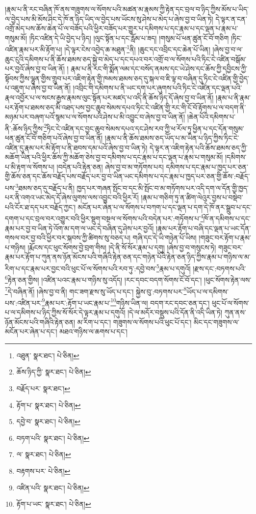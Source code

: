 །རྣམ་པ་ནི་རང་བཞིན་ཁོ་ནས་གཟུགས་ལ་སོགས་པའི་མཚན་མ་རྣམས་ཀྱི་རྟེན་དང་བྲལ་བ་ཉིད་ཀྱིས་མོས་པ་ཡིད་ལ་བྱེད་པས་མི་མོས་ཤིང་དེ་ཁོ་ན་ཉིད་ཡིད་ལ་བྱེད་པས་ཡོངས་སུ་ཤེས་པ་མེད་པ་ཞེས་བྱ་བ་ཡིན་ཏེ། དེ་ལྟར་ན་ངན་འགྲོ་མེད་པས་ཆོས་ཆེན་པོ་ལ་བཟོད་པའི་ཕྱིར་བཟོད་པར་གྱུར་པ་དམིགས་པ་དང་རྣམ་པ་དང་ལྡན་པ་རྣམ་པ་གསུམ་མོ། །ཏིང་འཛིན་དེ་ཡི་བྱེད་པ་ཉིད། །ལུང་སྟོན་པ་དང་རློམ་པ་ཟད། །གསུམ་པོ་ཕན་ཚུན་ངོ་བོ་གཅིག །ཏིང་འཛིན་རྣམ་པར་མི་རྟོག་པ། །དེ་ལྟར་ངེས་འབྱེད་ཆ་མཐུན་\footnote{འཐུན་  སྣར་ཐང་།  པེ་ཅིན། }ནི། །ཆུང་དང་འབྲིང་དང་ཆེན་པོ་ཡིན། །ཞེས་བྱ་བ་ལ་ཆུང་ངུའི་དམིགས་པ་ནི་ཆོས་ཐམས་ཅད་སྐྱེ་བ་མེད་པ་དང་དཔའ་བར་འགྲོ་བ་ལ་སོགས་པའི་ཏིང་ངེ་འཛིན་བསྒོམ་པར་བྱའོ་ཞེས་བྱ་བ་ཡིན་ནོ། །
རྣམ་པ་ནི་རང་གི་སྨོན་ལམ་དང་བསོད་ནམས་དང་ཡེ་ཤེས་དང་ཆོས་ཀྱི་དབྱིངས་ཀྱི་སྟོབས་ཀྱིས་ལྷུན་གྱིས་གྲུབ་པར་འཇིག་རྟེན་གྱི་ཁམས་ཐམས་ཅད་དུ་སྐལ་བ་ཇི་ལྟ་བ་བཞིན་དུ་ཏིང་ངེ་འཛིན་གྱི་བྱེད་པ་འཇུག་པ་ཞེས་བྱ་བ་ཡིན་ནོ། །འབྲིང་གི་དམིགས་པ་ནི་ཡང་དག་པར་ཞུགས་པའི་ཏིང་ངེ་འཛིན་དང་ལྡན་པའི་རྣལ་འབྱོར་པ་ལ་སངས་རྒྱས་རྣམས་ལུང་སྟོན་པར་མཛད་པ་འདི་ནི་ཆོས་ཉིད་དོ་ཞེས་བྱ་བ་ཡིན་ནོ། །རྣམ་པ་ནི་རྣམ་པར་རྟོག་པ་ཐམས་ཅད་མི་འཐད་པས་བྱང་ཆུབ་སེམས་དཔའ་ཏིང་ངེ་འཛིན་གྱི་རང་གི་ངོ་བོ་རྟོགས་པ་ལ་བདག་ནི་མཉམ་པར་བཞག་པའོ་སྙམ་པ་ལ་སོགས་པའི་ཤེས་པ་མི་འབྱུང་བ་ཞེས་བྱ་བ་ཡིན་ནོ། །ཆེན་པོའི་དམིགས་པ་ནི་:ཆོས་ཉིད་ཀྱིས་\footnote{ཆོས་ཉིད་ཀྱི་  སྣར་ཐང་།  པེ་ཅིན། }ཏིང་ངེ་འཛིན་དང་བྱང་ཆུབ་སེམས་དཔའ་དང་ཤེས་རབ་ཀྱི་ཕ་རོལ་ཏུ་ཕྱིན་པ་དང་དོན་གསུམ་ཕན་ཚུན་ངོ་བོ་གཅིག་པའོ་ཞེས་བྱ་བ་ཡིན་ནོ། །རྣམ་པ་ནི་ཆོས་ཐམས་ཅད་ཡོད་པ་མ་ཡིན་པ་ཉིད་ཀྱིས་ཏིང་ངེ་འཛིན་དུ་རྣམ་པར་མི་རྟོག་པ་ནི་ཐབས་དམ་པའོ་ཞེས་བྱ་བ་ཡིན་ཏེ། དེ་ལྟར་ན་འཇིག་རྟེན་པའི་ཆོས་ཐམས་ཅད་ཀྱི་མཆོག་ཡིན་པའི་ཕྱིར་ཆོས་ཀྱི་མཆོག་ཅེས་བྱ་བ་དམིགས་པ་དང་རྣམ་པ་དང་ལྡན་པ་རྣམ་པ་གསུམ་མོ། །དམིགས་པ་མི་རྟག་ལ་སོགས་པ། །བདེན་པའི་རྟེན་ཅན། ཞེས་བྱ་བ་མ་གཏོགས་པར། དམིགས་པ་དང་རྣམ་པ་ཁྱད་པར་ཅན་གྱི་ཆོས་ཅན་དང་ཆོས་བརྗོད་པས་བརྗོད་པར་བྱ་བ་ཡིན་ཡང་དམིགས་པ་དང་རྣམ་པ་ཁྱད་པར་ཅན་གྱི་ཆོས་:བརྗོད་པས་\footnote{བརྗོད་པར་  སྣར་ཐང་། }ཐམས་ཅད་དུ་བརྗོད་པ་ནི། ཁྱད་པར་གཞན་སྤོང་བ་དང་མི་སྤོང་བ་མ་གཏོགས་པར་འདི་དག་ལ་དོན་གྱི་ཁྱད་པར་ནི་འགའ་ཡང་མེད་དོ་ཞེས་ལུགས་ལས་འབྱུང་བའི་ཕྱིར་རོ། །རྣམ་པ་གཅིག་ཏུ་ན་ཚིག་ལེའུར་བྱས་པ་བསྡེབ་པའི་ངོར་ཐ་དད་པར་བརྗོད་ཀྱང་། མངོན་པར་ཞེན་པ་ལ་སོགས་པ་བཀག་པ་དང་ལྡན་པ་དག་དེ་ཁོ་ནར་སྒྲུབ་པ་དང་དགག་པ་དང་བྲལ་བར་འགྱུར་བའི་ཕྱིར་སྡུག་བསྔལ་ལ་སོགས་པའི་བདེན་པར་:གཏོགས་པ་\footnote{རྟོག་པ་  སྣར་ཐང་།  པེ་ཅིན། }ཁོ་ན་དམིགས་པ་དང་རྣམ་པར་བྱ་བ་ཡིན་ཏེ་འོག་མ་དག་ལ་ཡང་དེ་བཞིན་དུ་ཤེས་པར་བྱའོ། །རྣམ་པར་རྟོག་པ་བཞི་དང་ལྡན་པ་ཡང་དོན་གསལ་བར་བྱ་བའི་ཕྱིར་བར་སྐབས་ཀྱི་ཚིགས་སུ་བཅད་པ། གཞི་དང་དེ་ཡི་གཉེན་པོ་ཡིས། །གཟུང་བར་རྟོག་པ་རྣམ་པ་གཉིས། །རྨོངས་དང་ཕུང་སོགས་བྱེ་བྲག་གིས། །དེ་ནི་སོ་སོར་རྣམ་པ་དགུ། །ཞེས་བྱ་བ་གསུངས་ཏེ། གཟུང་བར་རྣམ་པར་རྟོག་པ་ཀུན་ནས་ཉོན་མོངས་པའི་གཞིའི་རྟེན་ཅན་དང་གཉེན་པོའི་རྟེན་ཅན་ཉིད་ཀྱིས་རྣམ་པ་གཉིས་ལ་མ་རིག་པ་དང་རྣམ་པར་བྱང་བའི་ཕུང་པོ་ལ་སོགས་པའི་རབ་ཏུ་:དབྱེ་བས་\footnote{དབྱེ་བ་  སྣར་ཐང་།  པེ་ཅིན། }རྣམ་པ་དགུའོ། །རྫས་དང་:བཏགས་པའི་\footnote{བཏག་པའི་  སྣར་ཐང་།  པེ་ཅིན། }རྟེན་ཅན་གྱིས། །འཛིན་པའང་རྣམ་པ་གཉིས་སུ་འདོད། །རང་དབང་བདག་སོགས་ངོ་བོ་དང་། །ཕུང་སོགས་རྟེན་ལས་\footnote{ལ་  སྣར་ཐང་།  པེ་ཅིན། }དེ་བཞིན་ནོ། །ཞེས་བྱ་བ་ནི། གང་ཟག་རྫས་སུ་ཡོད་པ་དང་། སྐྱེས་བུ་:བཏགས་པར་\footnote{བརྟགས་པར་  པེ་ཅིན། }ཡོད་པ་ལ་དམིགས་པས་:འཛིན་པར་\footnote{འཛིན་པའི་  སྣར་ཐང་།  པེ་ཅིན། }རྣམ་པར་:རྟོག་པ་ཡང་རྣམ་པ་\footnote{རྟོག་པ་ཡང་  སྣར་ཐང་།  པེ་ཅིན། }གཉིས་ཡིན་ལ། བདག་རང་དབང་ཅན་དང་། ཕུང་པོ་ལ་སོགས་པ་ལ་དམིགས་པ་ཉིད་ཀྱིས་སོ་སོར་དེ་ལྟར་རྣམ་པ་དགུའོ། །དེ་ལ་མདོར་བསྡུས་པའི་དོན་ནི་འདི་ཡིན་ཏེ། ཀུན་ནས་ཉོན་མོངས་པའི་གཞིའི་རྟེན་ཅན། མ་རིག་པ་དང་། གཟུགས་ལ་སོགས་པའི་ཕུང་པོ་དང་། མིང་དང་གཟུགས་ལ་མངོན་པར་ཞེན་པ་དང་། མཐའ་གཉིས་ལ་ཆགས་པ་དང་། 